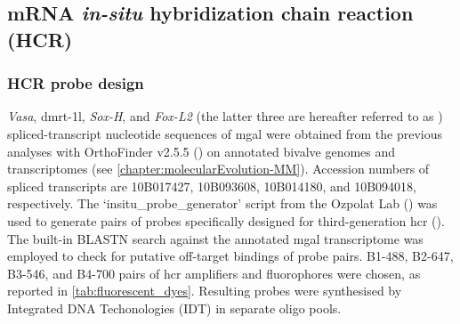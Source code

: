 \subsection{mRNA \textit{in-situ} hybridization chain reaction (HCR)}
\subsubsection{HCR probe design}
\textit{Vasa}, \gls{dmrt-1l}, \textit{Sox-H}, and \textit{Fox-L2} (the latter three are hereafter referred to as ) spliced-transcript nucleotide sequences of \gls{mgal} were obtained from the previous analyses with OrthoFinder v2.5.5 () on annotated bivalve genomes and transcriptomes (see \cref{chapter:molecularEvolution-MM}). Accession numbers of spliced transcripts are 10B017427, 10B093608, 10B014180, and 10B094018, respectively. The ‘insitu\_probe\_generator’ script from the Ozpolat Lab () was used to generate pairs of probes specifically designed for third-generation \gls{hcr} (). The built-in BLASTN search against the annotated \gls{mgal} transcriptome was employed to check for putative off-target bindings of probe pairs. B1-488, B2-647, B3-546, and B4-700 pairs of \gls{hcr} amplifiers and fluorophores were chosen, as reported in \cref{tab:fluorescent_dyes}. Resulting probes were synthesised by Integrated DNA Techonologies (IDT\texttrademark) in separate oligo pools.

